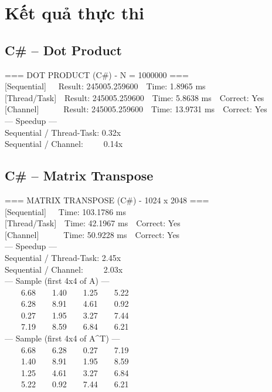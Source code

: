 \documentclass[12pt,a4paper]{article}
\begin{document}
\section{Kết quả thực thi}

\subsection{C\# -- Dot Product}

\begin{tcolorbox}[title=Console Output -- DotProductCS (dotnet run -c Release),colback=black!5]
\ttfamily\small
=== DOT PRODUCT (C\#) - N = 1000000 ===\\[3pt]
{[Sequential]}\ \ \ Result: 245005.259600\ \ Time: 1.8965 ms\\
{[Thread/Task]}\ \ Result: 245005.259600\ \ Time: 5.8638 ms\ \ Correct: Yes\\
{[Channel]}\ \ \ \ \ \ Result: 245005.259600\ \ Time: 13.9731 ms\ \ Correct: Yes\\[3pt]
--- Speedup ---\\
Sequential / Thread-Task: 0.32x\\
Sequential / Channel:\ \ \ \ \ 0.14x
\end{tcolorbox}

\subsection{C\# -- Matrix Transpose}

\begin{tcolorbox}[title=Console Output -- MatrixTransposeCS (dotnet run -c Release),colback=black!5]
\ttfamily\small
=== MATRIX TRANSPOSE (C\#) - 1024 x 2048 ===\\[3pt]
{[Sequential]}\ \ \ Time: 103.1786 ms\\
{[Thread/Task]}\ \ Time: 42.1967 ms\ \ Correct: Yes\\
{[Channel]}\ \ \ \ \ \ Time: 50.9228 ms\ \ Correct: Yes\\[3pt]
--- Speedup ---\\
Sequential / Thread-Task: 2.45x\\
Sequential / Channel:\ \ \ \ \ 2.03x\\[3pt]
--- Sample (first 4x4 of A) ---\\
\ \ \ \ 6.68\ \ \ \ 1.40\ \ \ \ 1.25\ \ \ \ 5.22\\
\ \ \ \ 6.28\ \ \ \ 8.91\ \ \ \ 4.61\ \ \ \ 0.92\\
\ \ \ \ 0.27\ \ \ \ 1.95\ \ \ \ 3.27\ \ \ \ 7.44\\
\ \ \ \ 7.19\ \ \ \ 8.59\ \ \ \ 6.84\ \ \ \ 6.21\\[3pt]
--- Sample (first 4x4 of A\^{}T) ---\\
\ \ \ \ 6.68\ \ \ \ 6.28\ \ \ \ 0.27\ \ \ \ 7.19\\
\ \ \ \ 1.40\ \ \ \ 8.91\ \ \ \ 1.95\ \ \ \ 8.59\\
\ \ \ \ 1.25\ \ \ \ 4.61\ \ \ \ 3.27\ \ \ \ 6.84\\
\ \ \ \ 5.22\ \ \ \ 0.92\ \ \ \ 7.44\ \ \ \ 6.21
\end{tcolorbox}
\end{document}
